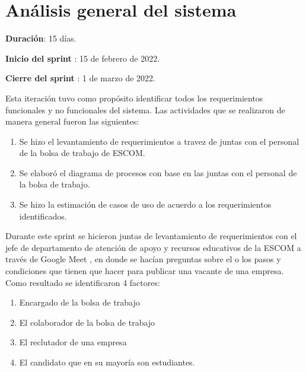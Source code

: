 \clearpage
\section{Análisis general del sistema}
    \begin{description}
        \item \textbf{Duración}: 15 días.
        \item \textbf{Inicio del sprint }: 15 de febrero de 2022.
        \item \textbf{Cierre del sprint }: 1 de marzo de 2022.
    \end{description}

    Esta iteración tuvo como propósito identificar todos los requerimientos funcionales y no funcionales del sistema. 
    Las actividades que se realizaron de manera general fueron las siguientes:
    \begin{enumerate}
        \item Se hizo el levantamiento de requerimientos a travez de juntas con el personal de la bolsa de trabajo de ESCOM.
        \item Se elaboró el diagrama de procesos con base en las juntas con el personal de la bolsa de trabajo.
        \item Se hizo la estimación de casos de uso de acuerdo a los requerimientos identificados.
    \end{enumerate} 

    Durante este sprint  se hicieron juntas de levantamiento de requerimientos con el jefe de departamento de atención de apoyo y recursos educativos de la ESCOM  a través de Google Meet , en donde se hacían preguntas sobre el o los pasos y condiciones que tienen que hacer para publicar una vacante de una empresa.
    Como resultado se identificaron 4  factores:
    \begin{enumerate}
        \item Encargado de la bolsa de trabajo
        \item El colaborador de la bolsa de trabajo
        \item El reclutador de una empresa 
        \item El candidato que en su mayoría son estudiantes.
    \end{enumerate} 

